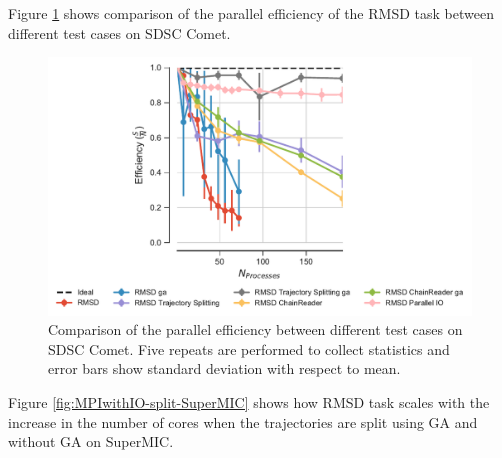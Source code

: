 \label{sec:splitting-timing}
Figure \ref{fig:comparison_efficiency} shows comparison of the parallel efficiency of the RMSD task between different test cases on SDSC Comet.  

\begin{figure}[ht!]
\centering
  \includegraphics[width=0.65\linewidth]{figures/Comparison_Efficiency_all.pdf}
\caption{Comparison of the parallel efficiency between different test cases on SDSC Comet.
Five repeats are performed to collect statistics and error bars show standard deviation with respect to mean.}
\label{fig:comparison_efficiency}
\end{figure} 

Figure \ref{fig:MPIwithIO-split-SuperMIC} shows how RMSD task scales with the increase in the number of cores when the trajectories are split using GA and without GA on SuperMIC.  
 
